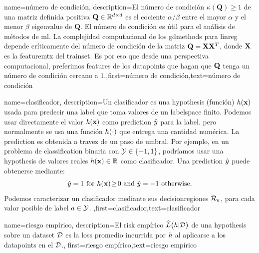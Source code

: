 {{
{
	name={número de condición},
	description={El número de condición $\kappa(\mathbf{Q}) \geq 1$ de una 
		matriz definida positiva $\mathbf{Q} \in \mathbb{R}^{d \times d}$ es el cociente 
		$\alpha /\beta  $ entre el 
		mayor $\alpha$ y el menor $\beta$ \gls{eigenvalue} de 
		$\mathbf{Q}$. El número de condición es útil para el análisis de métodos de \gls{ml}. 
		La complejidad computacional de los \gls{gdmethods} para \gls{linreg} depende críticamente del número 
		de condición de la matriz $\mathbf{Q} = {\bf X} {\bf X}^{T}$, donde ${\bf X}$  es la \gls{featuremtx}  
		del \gls{trainset}. Es por eso que desde una perspectiva computacional, preferimos \gls{feature}s de los 
		\gls{datapoint}s que hagan que $\mathbf{Q}$ tenga un número de condición cercano a $1$.},first={número de condición},text={número de condición} 
}

{
	name={clasificador},
	description={Un clasificador es una \gls{hypothesis} (función) $h({\bf x})$ 
		usada para predecir una \gls{label} que toma valores de un \gls{labelspace} finito. Podemos usar directamente 
		el valor $h({\bf x})$ como \gls{prediction} $\hat{y}$ para 
		la \gls{label}. pero normalmente se usa una función $h(\cdot)$ que entrega 
		una cantidad numérica. La \gls{prediction} es obtenida a travez de un paso de umbral. 
		Por ejemplo, en un problema de \gls{classification} binaria con \label{labelspace} $\mathcal{Y} \in  \{ -1,1\}$, 
		podríamos usar una \gls{hypothesis} de valores reales $h({\bf x}) \in \mathbb{R}$ 
		como clasificador. Una \gls{prediction} $\hat{y}$ puede obtenerse mediante:  
		 \begin{equation} 
		 	\label{equ_def_threshold_bin_classifier_dict}
		 	\hat{y} =1   \mbox{ for } h({\bf x})\!\geq\!0 \mbox{ and } 	\hat{y} =-1  \mbox{ otherwise.}
	 		\end{equation}
		Podemos caracterizar un clasificador mediante sus \gls{decisionregion}es $\mathcal{R}_{a}$, para 
		cada valor posible de \gls{label} $a \in \mathcal{Y}$. },first={clasificador},text={clasificador} 
}

{name={riesgo empírico},
 description={El \gls{risk} empírico $\widehat{L}\big(h|\mathcal{D}\big)$ 
 	de una \gls{hypothesis} sobre un \gls{dataset} $\mathcal{D}$ es la \gls{loss} promedio incurrida 
 	por $h$ al aplicarse a los \gls{datapoint}s en el $\mathcal{D}$.},
 first={riesgo empírico},text={riesgo empírico} 
}

}}
